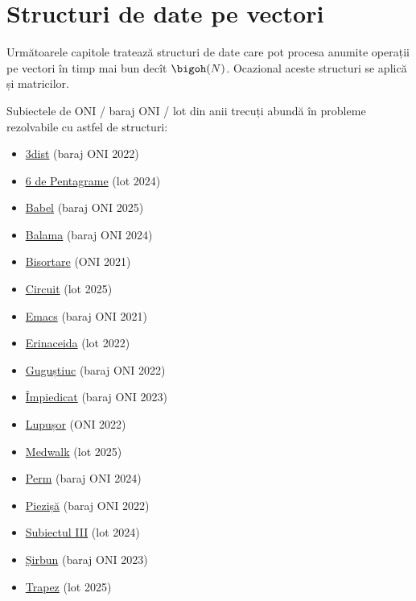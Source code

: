 \part{Structuri de date pe vectori}

Următoarele capitole tratează structuri de date care pot procesa anumite operații pe vectori în timp mai bun decît $\bigoh(N)$. Ocazional aceste structuri se aplică și matricilor.

Subiectele de ONI / baraj ONI / lot din anii trecuți abundă în probleme rezolvabile cu astfel de structuri:

\begin{itemize}
  \item \href{https://kilonova.ro/problems/141}{3dist} (baraj ONI 2022)
  \item \href{https://kilonova.ro/problems/2801}{6 de Pentagrame} (lot 2024)
  \item \href{https://kilonova.ro/problems/3734}{Babel} (baraj ONI 2025)
  \item \href{https://kilonova.ro/problems/2666}{Balama} (baraj ONI 2024)
  \item \href{https://kilonova.ro/problems/63}{Bisortare} (ONI 2021)
  \item \href{https://kilonova.ro/problems/3806}{Circuit} (lot 2025)
  \item \href{https://kilonova.ro/problems/76}{Emacs} (baraj ONI 2021)
  \item \href{https://kilonova.ro/problems/210}{Erinaceida} (lot 2022)
  \item \href{https://kilonova.ro/problems/210}{Guguștiuc} (baraj ONI 2022)
  \item \href{https://kilonova.ro/problems/565}{Împiedicat} (baraj ONI 2023)
  \item \href{https://kilonova.ro/problems/137}{Lupușor} (ONI 2022)
  \item \href{https://kilonova.ro/problems/3790}{Medwalk} (lot 2025)
  \item \href{https://kilonova.ro/problems/2669}{Perm} (baraj ONI 2024)
  \item \href{https://kilonova.ro/problems/142}{Piezișă} (baraj ONI 2022)
  \item \href{https://kilonova.ro/problems/2843}{Subiectul III} (lot 2024)
  \item \href{https://kilonova.ro/problems/556}{Șirbun} (baraj ONI 2023)
  \item \href{https://kilonova.ro/problems/3790}{Trapez} (lot 2025)
\end{itemize}

